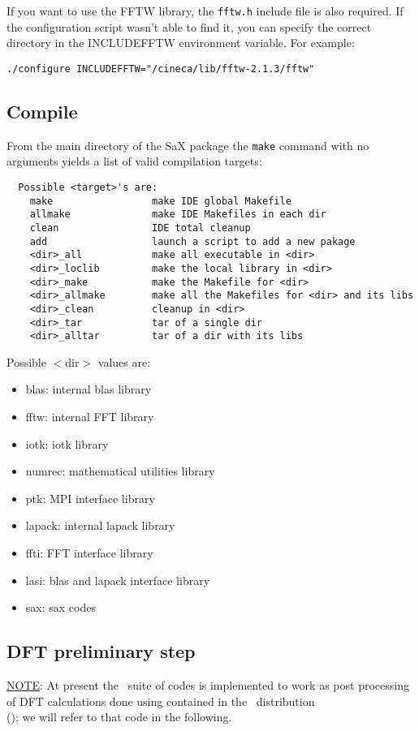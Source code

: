 \documentclass[11pt]{article}
\begin{document}
\noindent If you want to use the FFTW library, the \texttt{fftw.h}
include file is also required.  If the configuration script wasn't
able to find it, you can specify the correct directory in the
INCLUDEFFTW environment variable. For example:
%
%
\begin{description}
  \item {\tt ./configure INCLUDEFFTW="/cineca/lib/fftw-2.1.3/fftw" }
\end{description}
%
%
\subsection{Compile}

From the main directory of the SaX package the \texttt{make} command with no arguments yields a list of valid compilation
targets:
\begin{verbatim}
  Possible <target>'s are:
    make                 make IDE global Makefile
    allmake              make IDE Makefiles in each dir
    clean                IDE total cleanup
    add                  launch a script to add a new pakage
    <dir>_all            make all executable in <dir>
    <dir>_loclib         make the local library in <dir>
    <dir>_make           make the Makefile for <dir>
    <dir>_allmake        make all the Makefiles for <dir> and its libs
    <dir>_clean          cleanup in <dir>
    <dir>_tar            tar of a single dir
    <dir>_alltar         tar of a dir with its libs
\end{verbatim}
Possible $<$dir$>$ values are:
\begin{itemize}
\item
    blas: internal blas library
\item
    fftw: internal FFT library
\item
    iotk: iotk library
\item
    numrec: mathematical utilities library
\item
    ptk: MPI interface library
\item
    lapack: internal lapack library
\item
    ffti: FFT interface library
\item
    lasi: blas and lapack interface library
\item
    sax: sax codes
\end{itemize}

\subsection{DFT preliminary step}
\noindent \underline {NOTE}: At present the \SAX\ suite of codes is
implemented to work as post processing of DFT
calculations done using \PWSCF contained in the \ESPRESSO~distribution\\ 
(\ESPRESSOURL); we will refer to that code in the following.\\
\end{document}

